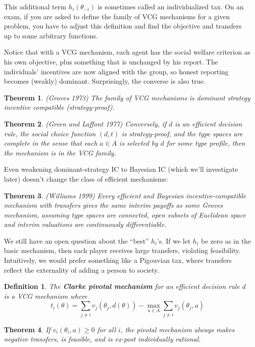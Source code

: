 \documentclass[letter, 10pt]{article}
\theoremstyle{basic}
\newtheorem{definition}{Definition}[section]
\newtheorem{theorem}{Theorem}[section]
\begin{document}
\begin{spacing}{1.0}
This additional term $h_i(\theta_{-i})$ is sometimes called an
individualized tax. On an exam, if you are asked to define the family of
VCG mechanisms for a given problem, you have to adjust this definition and
find the objective and transfers up to some arbitrary functions.

\hspace{1em} Notice that with a VCG mechanism, each agent has the social welfare
criterion as his own objective, plus something that is unchanged by his
report. The individuals' incentives are now aligned with the group, so
honest reporting becomes (weakly) dominant. Surprisingly, the converse is
also true.
\begin{theorem}
  (Groves 1973) The family of VCG mechanisms is dominant strategy incentive
  compatible (strategy-proof).
\end{theorem}
\begin{theorem}
  (Green and Laffont 1977) Conversely, if $d$ is an efficient decision
  rule, the social choice function $(d,t)$ is strategy-proof, and the type
  spaces are complete in the sense that each $a \in A$ is selected by $d$
  for some type profile, then the mechanism is in the VCG family.
\end{theorem}
Even weakening dominant-strategy IC to Bayesian IC (which we'll investigate
later) doesn't change the class of efficient mechanisms:
\begin{theorem}
  (Williams 1999) Every efficient and Bayesian incentive-compatible
  mechanism with transfers gives the same interim payoffs as some Groves
  mechanism, assuming type spaces are connected, open subsets of Euclidean
  space and interim valuations are continuously differentiable.
\end{theorem}

We still have an open question about the ``best'' $h_i$'s. If we let $h_i$
be zero as in the basic mechanism, then each player receives large
transfers, violating feasibility. Intuitively, we would prefer something
like a Pigouvian tax, where transfers reflect the externality of adding a
person to society.

\begin{definition}
  The \textbf{Clarke pivotal mechanism} for an efficient decision rule $d$
  is a VCG mechanism where \[t_i(\theta) = \sum_{j \neq i} v_j(\theta_j,
  d(\theta)) - \max_{a\in A} \sum_{j\neq i} v_j(\theta_j, a)\]
\end{definition}

\begin{theorem}
  If $v_i(\theta_i,a)\geq 0$ for all $i$, the pivotal mechanism always
  makes negative transfers, is feasible, and is ex-post individually
  rational.
\end{theorem}


\end{spacing}
\end{document}

